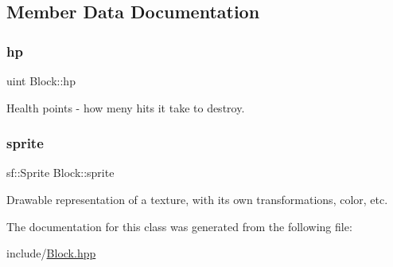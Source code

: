 \subsection{Member Data Documentation}
\mbox{\label{class_block_a8b1d6db0268d1e54f55c8824cbb429f2}} 
\subsubsection{\texorpdfstring{hp}{hp}}
{\footnotesize\ttfamily uint Block\+::hp\hspace{0.3cm}{\ttfamily [private]}}



Health points -\/ how meny hits it take to destroy. 

\mbox{\label{class_block_a0fb8279435ff1a353df3170f26428bff}} 
\subsubsection{\texorpdfstring{sprite}{sprite}}
{\footnotesize\ttfamily sf\+::\+Sprite Block\+::sprite\hspace{0.3cm}{\ttfamily [private]}}



Drawable representation of a texture, with its own transformations, color, etc. 



The documentation for this class was generated from the following file\+:\begin{DoxyCompactItemize}
\item 
include/\mbox{\hyperlink{_block_8hpp}{Block.\+hpp}}\end{DoxyCompactItemize}
